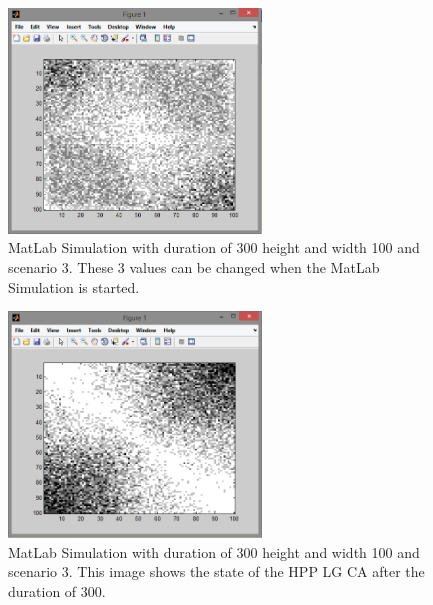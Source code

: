 \documentclass[paper=a4, fontsize=11pt]{scrartcl} %
\numberwithin{equation}{section} %
\numberwithin{figure}{section} %
\numberwithin{table}{section} %
\begin{document}
\begin{figure}[!htp]
	\centering
		\includegraphics[width=0.60\textwidth]{Screenshots/MatLab-300-100-100-3-Start.PNG}
	\caption{MatLab Simulation with duration of 300 height and width 100 and scenario 3. These 3 values can be changed when the MatLab Simulation is started.}
	\label{fig:matlab-example1-start}
\end{figure}

\begin{figure}[!htp]
	\centering
		\includegraphics[width=0.60\textwidth]{Screenshots/MatLab-300-100-100-3-End.PNG}
	\caption{MatLab Simulation with duration of 300 height and width 100 and scenario 3. This image shows the state of the HPP LG CA after the duration of 300.}
	\label{fig:matlab-example1-end}
\end{figure}
\end{document}

